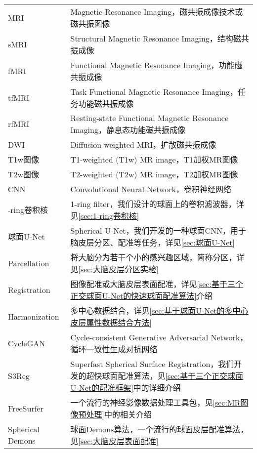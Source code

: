 \cleardoublepage
{}

\begin{center}
    \begin{longtable}{>{\raggedleft}p{}  p{}}
            MRI   & Magnetic Resonance Imaging，磁共振成像技术或磁共振图像\\
            sMRI & Structural Magnetic Resonance Imaging，结构磁共振成像 \\
            fMRI & Functional Magnetic Resonance Imaging，功能磁共振成像 \\
            tfMRI & Task Functional Magnetic Resonance Imaging，任务功能磁共振成像 \\
            rfMRI & Resting-state Functional Magnetic Resonance Imaging，静息态功能磁共振成像 \\
            DWI  & Diffusion-weighted MRI，扩散磁共振成像 \\
            T1w图像  & T1-weighted (T1w) MR image，T1加权MR图像 \\
            T2w图像  & T2-weighted (T2w) MR image，T2加权MR图像  \\
            CNN     & Convolutional Neural Network，卷积神经网络 \\
            1-ring卷积核 & 1-ring filter，我们设计的球面上的卷积滤波器，详见\ref{sec:1-ring卷积核} \\
            球面U-Net & Spherical U-Net，我们开发的一种球面CNN，用于脑皮层分区、配准等任务，详见\ref{sec:球面U-Net} \\
            Parcellation & 将大脑分为若干个小的感兴趣区域，简称分区，详见\ref{sec:大脑皮层分区实验} \\
            Registration & 图像配准或大脑皮层表面配准，详见\ref{sec:基于三个正交球面U-Net的快速球面配准算法}介绍 \\
            Harmonization & 多中心数据结合，详见\ref{sec:基于球面U-Net的多中心皮层属性数据结合方法} \\
            CycleGAN & Cycle-consistent Generative Adversarial Network，循环一致性生成对抗网络 \\
            S3Reg & Superfast Spherical Surface Registration，我们开发的超快球面配准算法，见\ref{sec:基于三个正交球面U-Net的配准框架}中的详细介绍 \\
            FreeSurfer & 一个流行的神经影像数据处理工具包，见\ref{sec:MR图像预处理}中的相关介绍 \\
            Spherical Demons & 球面Demons算法，一个流行的球面皮层配准算法，见\ref{sec:大脑皮层表面配准}\\

\end{longtable}
\end{center}
